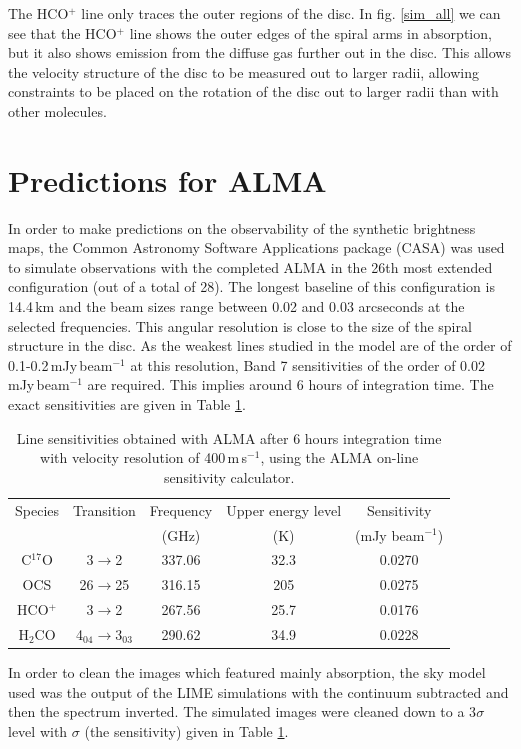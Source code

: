 \documentclass[useAMS,usenatbib]{mn2e}
\begin{document}
The HCO$^+$ line only traces the outer regions of the disc. In fig. \ref{sim_all} we can see that the HCO$^+$ line shows the outer edges of the spiral arms in absorption, but it also shows emission from the diffuse gas further out in the disc. This allows the velocity structure of the disc to be measured out to larger radii, allowing constraints to be placed on the rotation of the disc out to larger radii than with other molecules. 


\section{Predictions for ALMA} \label{sec:alma_predictions}

In order to make predictions on the observability of the synthetic brightness maps, the Common Astronomy Software Applications package (CASA) was used to simulate observations with the completed ALMA in the 26th most extended configuration (out of a total of 28). The longest baseline of this configuration is 14.4\,km and the beam sizes range between 0.02 and 0.03 arcseconds at the selected frequencies. This angular resolution is close to the size of the spiral structure in the disc. As the weakest lines studied in the model are of the order of 0.1-0.2$\,$mJy$\,$beam$^{-1}$ at this resolution, Band 7 sensitivities of the order of 0.02$\,$mJy$\,$beam$^{-1}$ are required. This implies around 6 hours of integration time. The exact sensitivities are given in Table \ref{sigmas}.
\begin{table}
  \centering
  \begin{minipage}{90mm}
    \caption{Line sensitivities obtained with ALMA after 6 hours integration time with velocity resolution of 400$\,$m\,s$^{-1}$, using the ALMA on-line sensitivity calculator.}
    \label{sigmas}
    \begin{tabular}{c||c|c|c|c}
      \hline
      Species & Transition & Frequency & Upper energy level & Sensitivity\\
                      &                    & (GHz)            & (K)                            & (mJy beam$^{-1}$) \\
      \hline
      C$^{17}$O & 3$\rightarrow$2 & 337.06 & 32.3 & 0.0270 \\
      OCS & 26$\rightarrow$25 & 316.15 & 205 & 0.0275 \\
      HCO$^+$ & 3$\rightarrow$2 & 267.56 & 25.7 & 0.0176 \\
      H$_2$CO & 4$_{04}\rightarrow$3$_{03}$ &  290.62 & 34.9 & 0.0228 \\
      \hline
    \end{tabular}
  \end{minipage}
\end{table}
In order to clean the images which featured mainly absorption, the sky model used was the output of the LIME simulations with the continuum subtracted and then the spectrum inverted. The simulated images were cleaned down to a 3$\sigma$ level with $\sigma$ (the sensitivity) given in Table \ref{sigmas}.\smallskip
\end{document}
